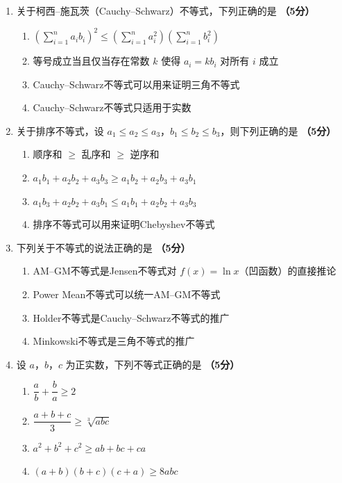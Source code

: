\documentclass[12pt, a4paper]{ctexart}
\newcommand{\score}[1]{\hfill\textbf{（#1分）}}
\begin{document}
\vspace{8pt}

\begin{enumerate}[resume]

\item 关于柯西--施瓦茨（Cauchy--Schwarz）不等式，下列正确的是 \score{5}
\begin{enumerate}[label=\Alph*.]
    \item $\left(\displaystyle\sum_{i=1}^{n}a_ib_i\right)^2\leq \left(\displaystyle\sum_{i=1}^{n}a_i^2\right)\left(\displaystyle\sum_{i=1}^{n}b_i^2\right)$
    \item 等号成立当且仅当存在常数 $k$ 使得 $a_i=kb_i$ 对所有 $i$ 成立
    \item Cauchy--Schwarz不等式可以用来证明三角不等式
    \item Cauchy--Schwarz不等式只适用于实数
\end{enumerate}

\item 关于排序不等式，设 $a_1\leq a_2\leq a_3$，$b_1\leq b_2\leq b_3$，则下列正确的是 \score{5}
\begin{enumerate}[label=\Alph*.]
    \item 顺序和 $\geq$ 乱序和 $\geq$ 逆序和
    \item $a_1b_1+a_2b_2+a_3b_3\geq a_1b_2+a_2b_3+a_3b_1$
    \item $a_1b_3+a_2b_2+a_3b_1\leq a_1b_1+a_2b_2+a_3b_3$
    \item 排序不等式可以用来证明Chebyshev不等式
\end{enumerate}

\item 下列关于不等式的说法正确的是 \score{5}
\begin{enumerate}[label=\Alph*.]
    \item AM--GM不等式是Jensen不等式对 $f(x)=\ln x$（凹函数）的直接推论
    \item Power Mean不等式可以统一AM--GM不等式
    \item Holder不等式是Cauchy--Schwarz不等式的推广
    \item Minkowski不等式是三角不等式的推广
\end{enumerate}

\item 设 $a$，$b$，$c$ 为正实数，下列不等式正确的是 \score{5}
\begin{enumerate}[label=\Alph*.]
    \item $\dfrac{a}{b}+\dfrac{b}{a}\geq 2$
    \item $\dfrac{a+b+c}{3}\geq \sqrt[3]{abc}$
    \item $a^2+b^2+c^2\geq ab+bc+ca$
    \item $(a+b)(b+c)(c+a)\geq 8abc$
\end{enumerate}

\end{enumerate}
\end{document}
